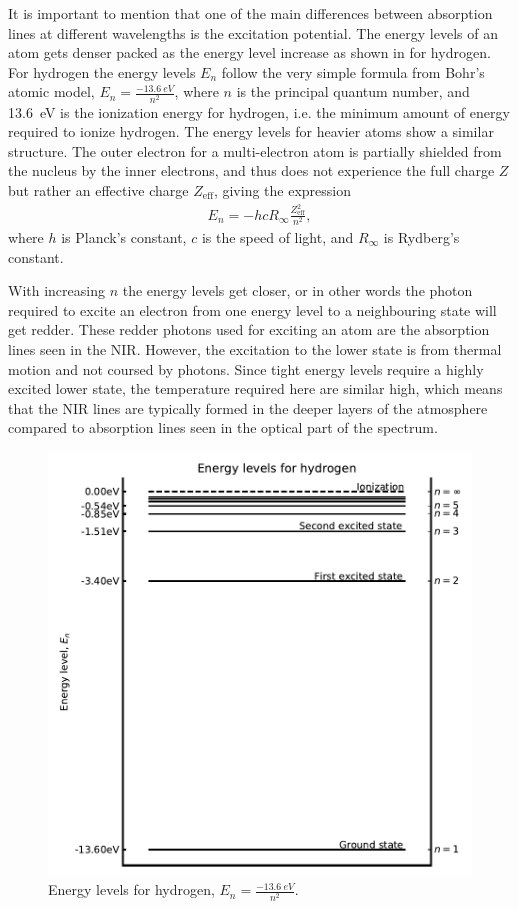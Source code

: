 It is important to mention that one of the main differences between absorption lines at different
wavelengths is the excitation potential. The energy levels of an atom gets denser packed as the
energy level increase as shown in  for hydrogen. For hydrogen the energy levels
$E_n$ follow the very simple formula from Bohr's atomic model, $E_n=\frac{\SI{-13.6}{eV}}{n^2}$,
where $n$ is the principal quantum number, and \SI{13.6}{eV} is the ionization energy for hydrogen,
i.e. the minimum amount of energy required to ionize hydrogen. The energy levels for heavier atoms
show a similar structure. The outer electron for a multi-electron atom is partially shielded from
the nucleus by the inner electrons, and thus does not experience the full charge $Z$ but rather an
effective charge $Z_\mathrm{eff}$, giving the expression
\begin{align}
  E_n = -hcR_\infty\frac{Z_\mathrm{eff}^2}{n^2},
\end{align}
where $h$ is Planck's constant, $c$ is the speed of light, and $R_\infty$ is Rydberg's constant.

With increasing $n$ the energy levels get closer, or in other words the photon required to excite an
electron from one energy level to a neighbouring state will get redder. These redder photons used
for exciting an atom are the absorption lines seen in the NIR. However, the excitation to the lower
state is from thermal motion and not coursed by photons. Since tight energy levels require a highly
excited lower state, the temperature required here are similar high, which means that the NIR lines
are typically formed in the deeper layers of the atmosphere compared to absorption lines seen in the
optical part of the spectrum.

\begin{figure}[htpb!]
    \centering
    \includegraphics[width=0.85\linewidth]{figures/energyLevels.pdf}
    \caption{Energy levels for hydrogen, $E_n=\frac{\SI{-13.6}{eV}}{n^2}$.}
    \label{fig:elevel}
\end{figure}

